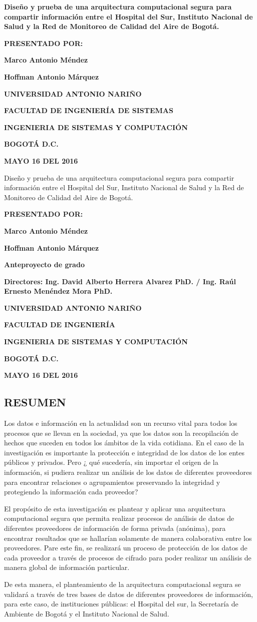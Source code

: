 \documentclass[a4paper, 12pt, oneside]{article}
\theoremstyle{definition}
\theoremstyle{remark}
\newcommand\portada{
\begin{titlepage}
		\begin{center}
			{\large \bf Diseño y prueba de una arquitectura computacional segura para compartir información entre el Hospital del Sur, Instituto Nacional de Salud y la Red de Monitoreo de Calidad del Aire de Bogotá.}
            
			\vfill
 			{\large\bf PRESENTADO POR: \par}
			{\large\bf Marco Antonio Méndez \par}
            {\large\bf Hoffman Antonio Márquez}
			\vfill
			{\large\bf UNIVERSIDAD ANTONIO NARIÑO  \par}
			{\large\bf FACULTAD DE INGENIERÍA DE SISTEMAS \par}
			{\large\bf INGENIERIA DE SISTEMAS Y COMPUTACIÓN \par}
			{\large\bf BOGOTÁ D.C.\par}
			{\large\bf MAYO 16 DEL 2016 \par}
		\end{center}
\end{titlepage}
}
\newcommand\contraportada{
	\begin{titlepage}
		\begin{center}
{Diseño y prueba de una arquitectura computacional segura para compartir información entre el Hospital del Sur, Instituto Nacional de Salud y la Red de Monitoreo de Calidad del Aire de Bogotá.} 
			\vfill
 			{\large\bf PRESENTADO POR: \par}
			{\large\bf Marco Antonio Méndez \par}
            {\large\bf Hoffman Antonio Márquez}
			\vfill
			{\large\bf Anteproyecto de grado \par}
			\vfill
			{\large\bf Directores: Ing. David Alberto Herrera Alvarez PhD. / Ing. Raúl Ernesto Menéndez Mora PhD. 
\par}
			\vfill
			{\large\bf UNIVERSIDAD ANTONIO NARIÑO \par}
			{\large\bf FACULTAD DE INGENIERÍA \par}
			{\large\bf INGENIERIA DE SISTEMAS Y COMPUTACIÓN \par}
			{\large\bf BOGOTÁ D.C.\par}
			{\large\bf MAYO 16 DEL 2016 \par}
		\end{center}
\end{titlepage}
}
\begin{document}
\portada
\contraportada
 




\renewcommand\contentsname{\centering TABLA DE CONTENIDOS}
\tableofcontents
\clearpage





\renewcommand{\thesection}{}
\renewcommand{\thesubsection}{\arabic{section}.\arabic{subsection}}
\makeatletter
\def\@seccntformat#1{\csname #1ignore\expandafter\endcsname\csname the#1\endcsname\quad}
\let\sectionignore\@gobbletwo
\let\latex@numberline\numberline
\def\numberline#1{\if\relax#1\relax\else\latex@numberline{#1}\fi}
\makeatother

\begin{center}
 \section{RESUMEN}
 \end{center}
 
Los datos e información en la actualidad son un recurso vital para todos los procesos que se llevan en la sociedad, ya que los datos son la recopilación de hechos que suceden en todos los ámbitos de la vida cotidiana. En el caso de la investigación es importante la protección e integridad de los datos de los entes públicos y privados. Pero ¿ qué sucedería, sin importar el origen de la información, si pudiera realizar un análisis de los datos de diferentes proveedores para encontrar relaciones o agrupamientos preservando la integridad y protegiendo la información cada proveedor?

El propósito de esta investigación es plantear y aplicar una arquitectura computacional segura que permita realizar procesos de análisis de datos de diferentes proveedores de información de forma privada (anónima), para encontrar resultados que se  hallarían solamente de manera colaborativa entre los proveedores. Pare este fin, se realizará un proceso de protección de los datos de cada proveedor a través de procesos de cifrado para poder realizar un análisis de manera global de información particular. 

De esta manera, el planteamiento de la arquitectura computacional segura se validará a través de tres bases de datos de diferentes proveedores de información, para este caso, de instituciones públicas: el Hospital del sur, la Secretaría de Ambiente de Bogotá y el Instituto Nacional de Salud.
 \clearpage
 
\end{document}
